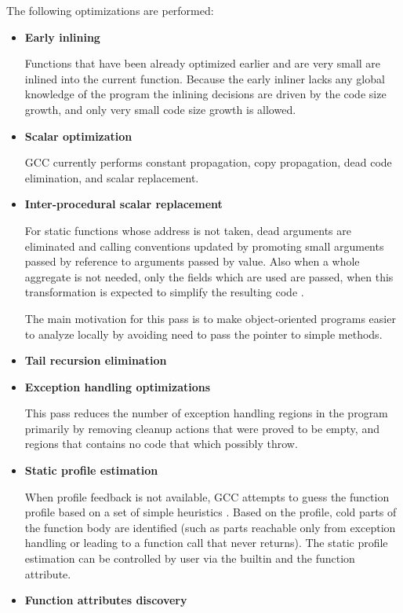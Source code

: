 \documentclass[final]{ols}
\begin{document}
The following optimizations are performed:
\begin{itemize}
\item {\bf Early inlining}

Functions that have been already optimized earlier and
are very small are inlined into the current function.
Because the early inliner lacks any global knowledge of the program the
inlining decisions are driven by the code size growth, and only very small code
size growth is allowed.
\item {\bf Scalar optimization}

GCC currently performs  constant
propagation, copy propagation, dead code elimination, and scalar replacement.
\item {\bf Inter-procedural scalar replacement}

For static functions whose
address is not taken, dead arguments are eliminated and calling
conventions updated by promoting small arguments passed by reference
to arguments passed by value. Also when a whole aggregate is not needed, only the fields which are used
are passed, when this transformation is expected to simplify the resulting code \cite{IPA-sra}.

The main motivation for this pass is to make object-oriented programs easier to
analyze locally by avoiding need to pass the  pointer to simple methods.
\item {\bf Tail recursion elimination}
\item {\bf Exception handling optimizations}

This pass reduces the number of exception
handling regions in the program primarily by removing cleanup actions that were
proved to be empty, and regions that contains no code that which possibly throw.
\item {\bf Static profile estimation}


When profile feedback is not available, GCC attempts to guess the function profile
based on a set of simple heuristics  \cite{BallLarus,naspaer}.
Based on the profile, cold parts of the function body are identified (such
as parts reachable only from exception handling or leading to a function call
that never returns).  The static profile estimation can be controlled by user
via the  builtin and the  function attribute.
\item {\bf Function attributes discovery}


\end{itemize}
\end{document}
